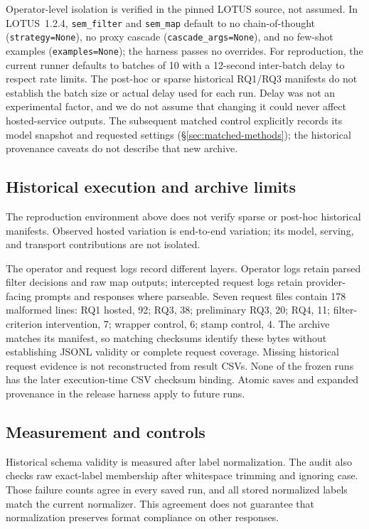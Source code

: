 \documentclass[11pt]{article}
\begin{document}
Operator-level isolation is verified in the pinned LOTUS source, not assumed. In LOTUS~1.2.4,
\texttt{sem\_filter} and \texttt{sem\_map} default to no
chain-of-thought (\texttt{strategy=None}), no proxy cascade
(\texttt{cascade\_args=None}), and no few-shot examples
(\texttt{examples=None}); the harness passes no overrides.
For reproduction, the current runner defaults to batches of 10 with a
12-second inter-batch delay to respect rate limits. The post-hoc or sparse
historical RQ1/RQ3 manifests do not establish the batch size or actual delay
used for each run.
Delay was not an experimental factor, and we do not assume that changing it
could never affect hosted-service outputs.
The subsequent matched control explicitly records its model snapshot and
requested settings (\S\ref{sec:matched-methods}); the historical provenance
caveats do not describe that new archive.

\subsection{Historical execution and archive limits}
The reproduction environment above does not verify sparse or post-hoc
historical manifests. Observed hosted variation is end-to-end variation;
its model, serving, and transport contributions are not isolated.

The operator and request logs record different layers. Operator logs retain
parsed filter decisions and raw map outputs; intercepted request logs retain
provider-facing prompts and responses where parseable. Seven request files
contain 178 malformed lines: RQ1 hosted, 92; RQ3, 38; preliminary RQ3, 20;
RQ4, 11; filter-criterion intervention, 7; wrapper control, 6; stamp control,
4. The archive matches its manifest, so matching checksums identify these bytes
without establishing JSONL validity or complete request coverage. Missing
historical request evidence is not reconstructed from result CSVs. None of the
frozen runs has the later execution-time CSV checksum binding. Atomic saves and
expanded provenance in the release harness apply to future runs.

\subsection{Measurement and controls}
Historical schema validity is measured after label normalization. The audit
also checks raw exact-label membership after whitespace trimming and ignoring
case. Those failure counts agree in every saved run, and all stored normalized
labels match the current normalizer. This agreement does not guarantee that
normalization preserves format compliance on other responses.
\end{document}
